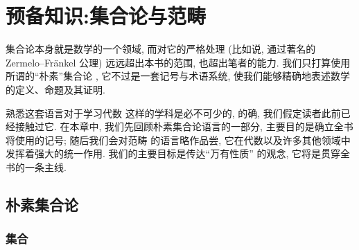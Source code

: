 
\chapter{预备知识:集合论与范畴}
\label{chap:prelim}


集合论本身就是数学的一个领域, 而对它的严格处理 (比如说, 通过著名的 Zermelo--Fränkel 公理)
远远超出本书的范围, 也超出笔者的能力. 我们只打算使用所谓的``朴素''集合论%
, 它不过是一套记号与术语系统, 使我们能够精确地表述数学的定义、命题及其证明.

熟悉这套语言对于学习代数%
这样的学科是必不可少的, 的确, 我们假定读者此前已经接触过它. 在本章中, 我们先回顾朴素集合论语言的一部分, 主要目的是确立全书将使用的记号; 随后我们会对范畴%
的语言略作品尝, 它在代数以及许多其他领域中发挥着强大的统一作用. 我们的主要目标是传达``万有性质''%
的观念, 它将是贯穿全书的一条主线.

\section{朴素集合论}
\label{sec:prelim-naive}

\subsection{集合}
\label{subsec:sets}

